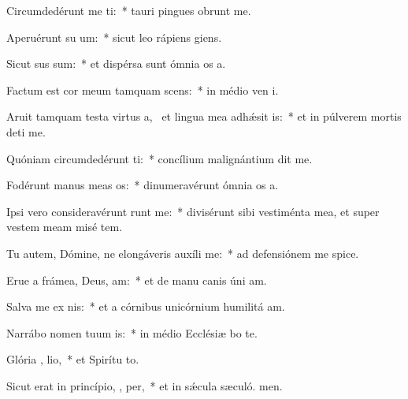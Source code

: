 \item Circumdedérunt me  ti:~* tauri pingues obrunt me.
\item Aperuérunt su   um:~* sicut leo rápiens  giens.
\item Sicut  sus sum:~* et dispérsa sunt ómnia os a.
\item Factum est cor meum tamquam  scens:~* in médio ven i.
\item Aruit tamquam testa virtus a,~\pscross{} et lingua mea adhǽsit  is:~* et in púlverem mortis deti me.
\item Quóniam circumdedérunt   ti:~* concílium malignántium dit me.
\item Fodérunt manus meas   os:~* dinumeravérunt ómnia os a.
\item Ipsi vero consideravérunt  runt me:~* divisérunt sibi vestiménta mea, et super vestem meam misé tem.
\item Tu autem, Dómine, ne elongáveris auxíli   me:~* ad defensiónem me spice.
\item Erue a frámea, Deus,  am:~* et de manu canis úni am.
\item Salva me ex  nis:~* et a córnibus unicórnium humilitá am.
\item Narrábo nomen tuum  is:~* in médio Ecclésiæ bo te.
\item Glória ,  lio,~* et Spirítu to.
\item Sicut erat in princípio,  ,  per,~* et in sǽcula sæculó. men.
